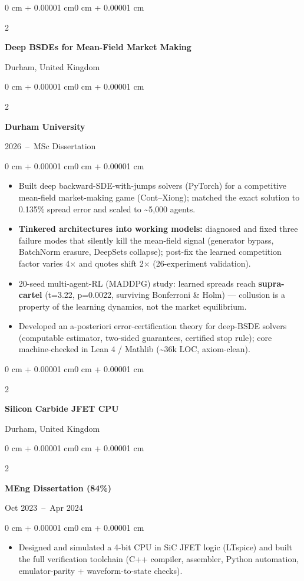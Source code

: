 \documentclass[10pt, letterpaper]{article}
\newenvironment{highlights}{
    \begin{itemize}[
        topsep=0.10 cm,
        parsep=0.10 cm,
        partopsep=0pt,
        itemsep=0pt,
        leftmargin=0 cm + 10pt
    ]
}{
    \end{itemize}
}
\newenvironment{onecolentry}{
    \begin{adjustwidth}{0 cm + 0.00001 cm}{0 cm + 0.00001 cm}
}{
    \end{adjustwidth}
}
\newenvironment{twocolentry}[2][]{
    \onecolentry{}
    \def\secondColumn{#2}
    \setcolumnwidth{\fill, 4.5 cm}
    \begin{paracol}{2}
}{
    \switchcolumn{} \raggedleft{} \secondColumn{}
    \end{paracol}
    \endonecolentry{}
}
\begin{document}
\begin{twocolentry}
  {Durham, United Kingdom}
  \textbf{Deep BSDEs for Mean-Field Market Making}
\end{twocolentry}
\begin{twocolentry}
  {2026~--~MSc Dissertation}
  \textbf{Durham University}
\end{twocolentry}
\vspace{0.10 cm}
\begin{onecolentry}
  \begin{highlights}
    \item Built deep backward-SDE-with-jumps solvers (PyTorch) for a competitive mean-field market-making game (Cont--Xiong); matched the exact solution to 0.135\% spread error and scaled to \textasciitilde5{,}000 agents.
    \item \textbf{Tinkered architectures into working models:} diagnosed and fixed three failure modes that silently kill the mean-field signal (generator bypass, BatchNorm erasure, DeepSets collapse); post-fix the learned competition factor varies 4$\times$ and quotes shift 2$\times$ (26-experiment validation).
    \item 20-seed multi-agent-RL (MADDPG) study: learned spreads reach \textbf{supra-cartel} (t=3.22, p=0.0022, surviving Bonferroni \& Holm) --- collusion is a property of the learning dynamics, not the market equilibrium.
    \item Developed an a-posteriori error-certification theory for deep-BSDE solvers (computable estimator, two-sided guarantees, certified stop rule); core machine-checked in Lean 4 / Mathlib (\textasciitilde36k LOC, axiom-clean).
  \end{highlights}
\end{onecolentry}

\vspace{0.08 cm}

\begin{twocolentry}
  {Durham, United Kingdom}
  \textbf{Silicon Carbide JFET CPU}
\end{twocolentry}
\begin{twocolentry}
  {Oct 2023~--~Apr 2024}
  \textbf{MEng Dissertation (84\%)}
\end{twocolentry}
\vspace{0.10 cm}
\begin{onecolentry}
  \begin{highlights}
    \item Designed and simulated a 4-bit CPU in SiC JFET logic (LTspice) and built the full verification toolchain (C++ compiler, assembler, Python automation, emulator-parity + waveform-to-state checks).
  \end{highlights}
\end{onecolentry}
\end{document}
